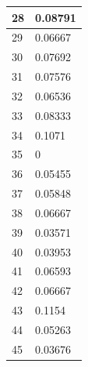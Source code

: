 \begin{tabular}{|l||l|}
	28 & 0.08791 \\ \hline
	29 & 0.06667 \\ \hline
	30 & 0.07692 \\ \hline
	31 & 0.07576 \\ \hline
	32 & 0.06536 \\ \hline
	33 & 0.08333 \\ \hline
	34 & 0.1071 \\ \hline
	35 & 0 \\ \hline
	36 & 0.05455 \\ \hline
	37 & 0.05848 \\ \hline
	38 & 0.06667 \\ \hline
	39 & 0.03571 \\ \hline
	40 & 0.03953 \\ \hline
	41 & 0.06593 \\ \hline
	42 & 0.06667 \\ \hline
	43 & 0.1154 \\ \hline
	44 & 0.05263 \\ \hline
	45 & 0.03676 \\ \hline
\end{tabular}
